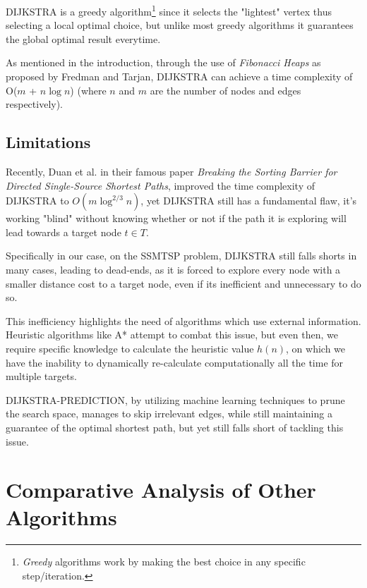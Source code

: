 \textsc{DIJKSTRA} is a greedy algorithm\footnote{\textit{Greedy} algorithms work by making the best choice in any specific step/iteration.} 
since it selects the "lightest" vertex thus selecting a local optimal choice, but unlike most greedy algorithms it guarantees the global optimal result everytime.

As mentioned in the introduction, through the use of \textit{Fibonacci Heaps} as proposed by Fredman and Tarjan\cite{fredmanFibonacciHeapsTheir1987}, 
\textsc{DIJKSTRA} can achieve a time complexity of O($m$ + $n\log n$) (where $n$ and $m$ are the number of nodes and edges respectively).

\subsection{Limitations}
\label{subsec:limits}
Recently, Duan et al. in their famous paper \textit{Breaking the Sorting Barrier for Directed Single-Source Shortest Paths}\cite{duanBreakingSortingBarrier2025}, 
improved the time complexity of \textsc{DIJKSTRA} to $O(m \log^{2/3}n)$, 
yet \textsc{DIJKSTRA} still has a fundamental flaw, it's working "blind" without knowing whether or not if the path it is exploring will lead towards a target node $t \in T$. 

Specifically in our case, on the SSMTSP problem, \textsc{DIJKSTRA} still falls shorts in many cases, leading to dead-ends, as it is forced to explore every node with a smaller distance cost to a target node, even if its inefficient and unnecessary to do so.

This inefficiency highlights the need of algorithms which use external information.
Heuristic algorithms like A*\cite{hartFormalBasisHeuristic1968b} attempt to combat this issue, but even then, we require specific knowledge to calculate the heuristic value $h(n)$, 
on which we have the inability to dynamically re-calculate computationally all the time for multiple targets.

\textsc{DIJKSTRA-PREDICTION}, by utilizing machine learning techniques to prune the search space, manages to skip irrelevant edges, while still maintaining a guarantee of the optimal shortest path, but yet still falls short of tackling this issue.

\section{Comparative Analysis of Other Algorithms}
\label{sec:compare_dijkstra}

